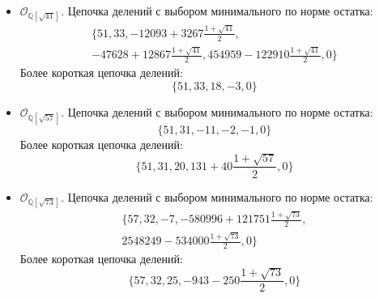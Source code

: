 \documentclass[_00_dissertation.tex]{subfiles}
\begin{document}
\begin{itemize}
    \item $\mathcal{O}_{\mathbb{Q}[\sqrt{41}]}$.
    Цепочка делений с выбором минимального по норме остатка:
    \begin{multline*}
        \{51, 33, -12093+3267\frac{1+\sqrt{41}}{2},\\
        -47628+12867\frac{1+\sqrt{41}}{2}, 454959-122910\frac{1+\sqrt{41}}{2}, 0\}
    \end{multline*}
    Более короткая цепочка делений:
    \begin{equation*}
        \{51, 33, 18, -3, 0\}
    \end{equation*}

    \item $\mathcal{O}_{\mathbb{Q}[\sqrt{57}]}$.
    Цепочка делений с выбором минимального по норме остатка:
    \begin{equation*}
        \{51, 31, -11, -2, -1, 0\}
    \end{equation*}
    Более короткая цепочка делений:
    \begin{equation*}
        \{51, 31, 20, 131+40\frac{1+\sqrt{57}}{2}, 0\}
    \end{equation*}

    \item $\mathcal{O}_{\mathbb{Q}[\sqrt{73}]}$.
    Цепочка делений с выбором минимального по норме остатка:
    \begin{multline*}
        \{57, 32, -7, -580996+121751\frac{1+\sqrt{73}}{2},\\
        2548249-534000\frac{1+\sqrt{73}}{2}, 0\}
    \end{multline*}
    Более короткая цепочка делений:
    \begin{equation*}
        \{57, 32, 25, -943-250\frac{1+\sqrt{73}}{2}, 0\}
    \end{equation*}
\end{itemize}

\onlyinsubfile{
    
    
}
\end{document}

